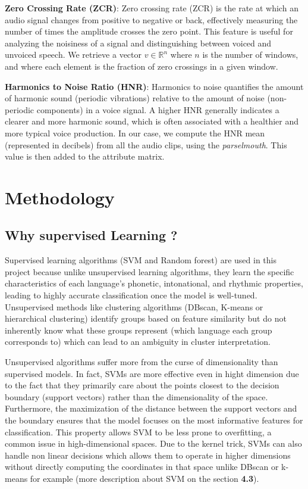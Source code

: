 \documentclass[twocolumn]{article}
\newcommand{\R}{\mathbb{R}}
\begin{document}
\textbf{Zero Crossing Rate (ZCR)}: Zero crossing rate (ZCR) is the rate at which an audio signal changes from positive to negative or back, effectively measuring the number of times the amplitude crosses the zero point. This feature is useful for analyzing the noisiness of a signal and distinguishing between voiced and unvoiced speech. We retrieve a vector $v \in \R^{n}$ where $n$ is the number of windows, and where each element is the fraction of zero crossings in a given window.

\textbf{Harmonics to Noise Ratio (HNR)}:
Harmonics to noise quantifies the amount of harmonic sound (periodic vibrations) relative to the amount of noise (non-periodic components) in a voice signal. A higher HNR generally indicates a clearer and more harmonic sound, which is often associated with a healthier and more typical voice production. In our case, we compute the HNR mean (represented in decibels) from all the audio clips, using the \textit{parselmouth}. This value is then added to the attribute matrix. 

\section{Methodology}
\subsection{Why supervised Learning ?}
Supervised learning algorithms (SVM and Random forest) are used in this project because unlike unsupervised learning algorithms, they learn the specific characteristics of each language’s phonetic, intonational, and rhythmic properties, leading to highly accurate classification once the model is well-tuned. Unsupervised methods like clustering algorithms (DBscan, K-means or hierarchical clustering) identify groups based on feature similarity but do not inherently know what these groups represent (which language each group corresponds to) which can lead to an ambiguity in cluster interpretation.

Unsupervised algorithms suffer more from the curse of dimensionality than supervised models. In fact, SVMs are more effective even in hight dimension due to the fact that they primarily care about the points closest to the decision boundary (support vectors) rather than the dimensionality of the space. Furthermore, the maximization of the distance between the support vectors and the boundary ensures that the model focuses on the most informative features for classification. This property allows SVM to be less prone to overfitting, a common issue in high-dimensional spaces. Due to the kernel trick, SVMs can also handle non linear decisions which allows them to operate in higher dimensions without directly computing the coordinates in that space unlike DBscan or k-means for example (more description about SVM on the section \textbf{4.3}).
\end{document}
